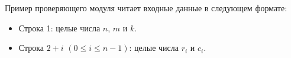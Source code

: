 Пример проверяющего модуля читает входные данные в следующем формате: 
\begin{itemize}

\item Строка 1: целые числа $n$, $m$ и $k$.
\item Строка $2 + i$ $(0 \le i \le n - 1)$: целые числа $r_i$ и $c_i$.
\end{itemize}
